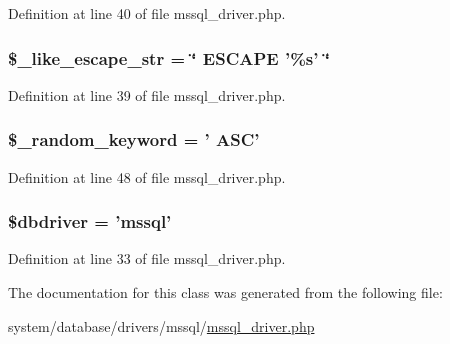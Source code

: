 Definition at line 40 of file mssql\-\_\-driver.\-php.

\hypertarget{class_c_i___d_b__mssql__driver_adf86ecadf3d0e1ce3f5e0eaeeb3867ae}{
\subsubsection[{\$\-\_\-like\-\_\-escape\-\_\-str}]{\setlength{\rightskip}{0pt plus 5cm}\$\-\_\-like\-\_\-escape\-\_\-str = \char`\"{} E\-S\-C\-A\-P\-E '\%s' \char`\"{}}}\label{class_c_i___d_b__mssql__driver_adf86ecadf3d0e1ce3f5e0eaeeb3867ae}


Definition at line 39 of file mssql\-\_\-driver.\-php.

\hypertarget{class_c_i___d_b__mssql__driver_a10213aa6e05f6d924d3277bb1d2fea00}{
\subsubsection[{\$\-\_\-random\-\_\-keyword}]{\setlength{\rightskip}{0pt plus 5cm}\$\-\_\-random\-\_\-keyword = ' A\-S\-C'}}\label{class_c_i___d_b__mssql__driver_a10213aa6e05f6d924d3277bb1d2fea00}


Definition at line 48 of file mssql\-\_\-driver.\-php.

\hypertarget{class_c_i___d_b__mssql__driver_a0cde2a16322a023d040aa7f725877597}{
\subsubsection[{\$dbdriver}]{\setlength{\rightskip}{0pt plus 5cm}\$dbdriver = 'mssql'}}\label{class_c_i___d_b__mssql__driver_a0cde2a16322a023d040aa7f725877597}


Definition at line 33 of file mssql\-\_\-driver.\-php.



The documentation for this class was generated from the following file\-:\begin{DoxyCompactItemize}
\item 
system/database/drivers/mssql/\hyperlink{mssql__driver_8php}{mssql\-\_\-driver.\-php}\end{DoxyCompactItemize}
